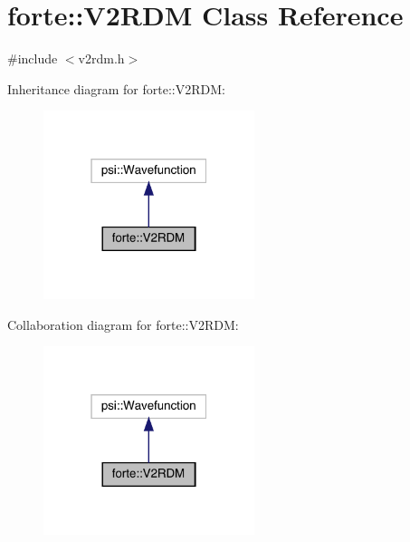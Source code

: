 \hypertarget{classforte_1_1_v2_r_d_m}{}\section{forte\+:\+:V2\+R\+DM Class Reference}
\label{classforte_1_1_v2_r_d_m}


{\ttfamily \#include $<$v2rdm.\+h$>$}



Inheritance diagram for forte\+:\+:V2\+R\+DM\+:
\nopagebreak
\begin{figure}[H]
\begin{center}
\leavevmode
\includegraphics[width=175pt]{classforte_1_1_v2_r_d_m__inherit__graph}
\end{center}
\end{figure}


Collaboration diagram for forte\+:\+:V2\+R\+DM\+:
\nopagebreak
\begin{figure}[H]
\begin{center}
\leavevmode
\includegraphics[width=175pt]{classforte_1_1_v2_r_d_m__coll__graph}
\end{center}
\end{figure}
